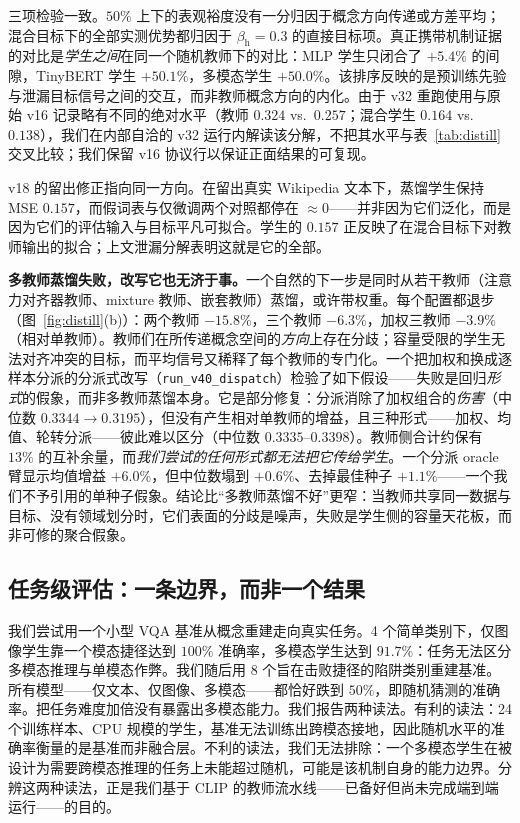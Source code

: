 \documentclass[10pt,twoside]{article}
\theoremstyle{definition}
\theoremstyle{plain}
\theoremstyle{remark}
\begin{document}
三项检验一致。$50\%$ 上下的表观裕度没有一分归因于概念方向传递或方差平均；混合目标下的全部实测优势都归因于 $\beta_{\text{h}}=0.3$ 的直接目标项。真正携带机制证据的对比是\emph{学生之间}在同一个随机教师下的对比：MLP 学生只闭合了 $+5.4\%$ 的间隙，TinyBERT 学生 $+50.1\%$，多模态学生 $+50.0\%$。该排序反映的是预训练先验与泄漏目标信号之间的交互，而非教师概念方向的内化。由于 v32 重跑使用与原始 v16 记录略有不同的绝对水平（教师 $0.324$ vs.\ $0.257$；混合学生 $0.164$ vs.\ $0.138$），我们在内部自洽的 v32 运行内解读该分解，不把其水平与表~\ref{tab:distill} 交叉比较；我们保留 v16 协议行以保证正面结果的可复现。

v18 的留出修正指向同一方向。在留出真实 Wikipedia 文本下，蒸馏学生保持 MSE $0.157$，而假词表与仅微调两个对照都停在 $\approx 0$——并非因为它们泛化，而是因为它们的评估输入与目标平凡可拟合。学生的 $0.157$ 正反映了在混合目标下对教师输出的拟合；上文泄漏分解表明这就是它的全部。

\textbf{多教师蒸馏失败，改写它也无济于事。}一个自然的下一步是同时从若干教师（注意力对齐器教师、mixture 教师、嵌套教师）蒸馏，或许带权重。每个配置都退步（图~\ref{fig:distill}(b)）：两个教师 $-15.8\%$，三个教师 $-6.3\%$，加权三教师 $-3.9\%$（相对单教师）。教师们在所传递概念空间的\emph{方向}上存在分歧；容量受限的学生无法对齐冲突的目标，而平均信号又稀释了每个教师的专门化。一个把加权和换成逐样本分派的分派式改写（\texttt{run\_v40\_dispatch}）检验了如下假设——失败是回归\emph{形式}的假象，而非多教师蒸馏本身。它是部分修复：分派消除了加权组合的\emph{伤害}（中位数 $0.3344 \rightarrow 0.3195$），但没有产生相对单教师的增益，且三种形式——加权、均值、轮转分派——彼此难以区分（中位数 $0.3335$--$0.3398$）。教师侧合计约保有 $13\%$ 的互补余量，而\emph{我们尝试的任何形式都无法把它传给学生}。一个分派 oracle 臂显示均值增益 $+6.0\%$，但中位数塌到 $+0.6\%$、去掉最佳种子 $+1.1\%$——一个我们不予引用的单种子假象。结论比``多教师蒸馏不好''更窄：当教师共享同一数据与目标、没有领域划分时，它们表面的分歧是噪声，失败是学生侧的容量天花板，而非可修的聚合假象。

\subsection{任务级评估：一条边界，而非一个结果}
\label{sec:vqa-exp}

我们尝试用一个小型 VQA 基准从概念重建走向真实任务。4 个简单类别下，仅图像学生靠一个模态捷径达到 $100\%$ 准确率，多模态学生达到 $91.7\%$：任务无法区分多模态推理与单模态作弊。我们随后用 8 个旨在击败捷径的陷阱类别重建基准。所有模型——仅文本、仅图像、多模态——都恰好跌到 $50\%$，即随机猜测的准确率。把任务难度加倍没有暴露出多模态能力。我们报告两种读法。有利的读法：24 个训练样本、CPU 规模的学生，基准无法训练出跨模态接地，因此随机水平的准确率衡量的是基准而非融合层。不利的读法，我们无法排除：一个多模态学生在被设计为需要跨模态推理的任务上未能超过随机，可能是该机制自身的能力边界。分辨这两种读法，正是我们基于 CLIP \citep{radford2021} 的教师流水线——已备好但尚未完成端到端运行——的目的。
\end{document}
